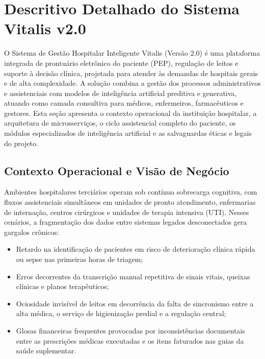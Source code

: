 
\section{Descritivo Detalhado do Sistema Vitalis v2.0}
\label{sec:descritivo}

O Sistema de Gestão Hospitalar Inteligente Vitalis (Versão 2.0) é uma plataforma integrada de prontuário eletrônico do paciente (PEP), regulação de leitos e suporte à decisão clínica, projetada para atender às demandas de hospitais gerais e de alta complexidade. A solução combina a gestão dos processos administrativos e assistenciais com modelos de inteligência artificial preditiva e generativa, atuando como camada consultiva para médicos, enfermeiros, farmacêuticos e gestores. Esta seção apresenta o contexto operacional da instituição hospitalar, a arquitetura de microsserviços, o ciclo assistencial completo do paciente, os módulos especializados de inteligência artificial e as salvaguardas éticas e legais do projeto.

\subsection{Contexto Operacional e Visão de Negócio}
\label{subsec:contexto_negocio}

Ambientes hospitalares terciários operam sob contínua sobrecarga cognitiva, com fluxos assistenciais simultâneos em unidades de pronto atendimento, enfermarias de internação, centros cirúrgicos e unidades de terapia intensiva (UTI). Nesses cenários, a fragmentação dos dados entre sistemas legados desconectados gera gargalos crônicos:

\begin{itemize}
    \item Retardo na identificação de pacientes em risco de deterioração clínica rápida ou sepse nas primeiras horas de triagem;
    \item Erros decorrentes da transcrição manual repetitiva de sinais vitais, queixas clínicas e planos terapêuticos;
    \item Ociosidade invisível de leitos em decorrência da falta de sincronismo entre a alta médica, o serviço de higienização predial e a regulação central;
    \item Glosas financeiras frequentes provocadas por inconsistências documentais entre as prescrições médicas executadas e os itens faturados nas guias da saúde suplementar.
\end{itemize}


